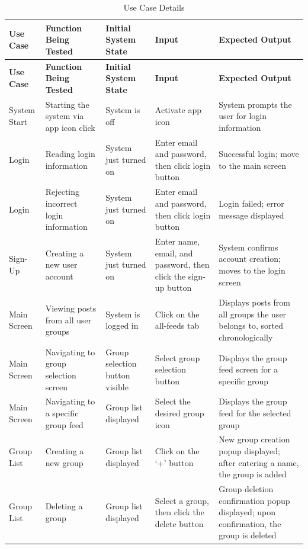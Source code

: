 \renewcommand{\arraystretch}{1.4} %
\setlength{\tabcolsep}{3pt} %
\begin{longtable}{|>{\centering\arraybackslash}p{}|>{\centering\arraybackslash}p{}|>{\centering\arraybackslash}p{}|>{\centering\arraybackslash}p{}|>{\centering\arraybackslash}p{}|}
\caption{Use Case Details} \\ %
\hline
\textbf{Use Case} & \textbf{Function Being Tested} & \textbf{Initial System State} & \textbf{Input} & \textbf{Expected Output} \\ \hline
\endfirsthead
\hline
\textbf{Use Case} & \textbf{Function Being Tested} & \textbf{Initial System State} & \textbf{Input} & \textbf{Expected Output} \\ \hline
\endhead
\hline
\endfoot
System Start & Starting the system via app icon click & System is off & Activate app icon & System prompts the user for login information \\ \hline
Login & Reading login information & System just turned on & Enter email and password, then click login button & Successful login; move to the main screen \\ \hline
Login & Rejecting incorrect login information & System just turned on & Enter email and password, then click login button & Login failed; error message displayed \\ \hline
Sign-Up & Creating a new user account & System just turned on & Enter name, email, and password, then click the sign-up button & System confirms account creation; moves to the login screen \\ \hline
Main Screen & Viewing posts from all user groups & System is logged in & Click on the all-feeds tab & Displays posts from all groups the user belongs to, sorted chronologically \\ \hline
Main Screen & Navigating to group selection screen & Group selection button visible & Select group selection button & Displays the group feed screen for a specific group \\ \hline
Main Screen & Navigating to a specific group feed & Group list displayed & Select the desired group icon & Displays the group feed for the selected group \\ \hline
Group List & Creating a new group & Group list displayed & Click on the ‘+’ button & New group creation popup displayed; after entering a name, the group is added \\ \hline
Group List & Deleting a group & Group list displayed & Select a group, then click the delete button & Group deletion confirmation popup displayed; upon confirmation, the group is deleted \\ \hline

\end{longtable}

